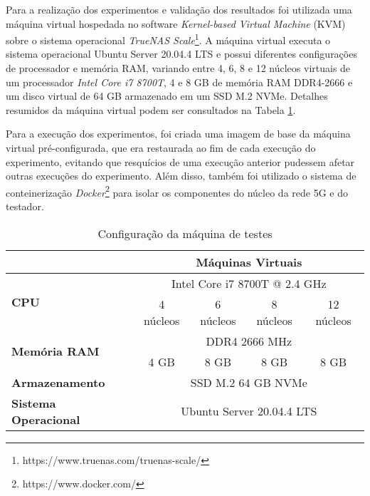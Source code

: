 
Para a realização dos experimentos e validação dos resultados foi utilizada uma máquina virtual hospedada no software \textit{Kernel-based Virtual Machine} (KVM) sobre o sistema operacional \textit{TrueNAS Scale}\footnote{https://www.truenas.com/truenas-scale/}.
A máquina virtual executa o sistema operacional Ubuntu Server 20.04.4 LTS e possui diferentes configurações de processador e memória RAM, variando entre 4, 6, 8 e 12 núcleos virtuais de um processador \textit{Intel Core i7 8700T}, 4 e 8 GB de memória RAM DDR4-2666 e um disco virtual de 64 GB armazenado em um SSD M.2 NVMe.
Detalhes resumidos da máquina virtual podem ser consultados na Tabela \ref{tab:vm-config}.

Para a execução dos experimentos, foi criada uma imagem de base da máquina virtual pré-configurada, que era restaurada ao fim de cada execução do experimento, evitando que resquícios de uma execução anterior pudessem afetar outras execuções do experimento.
Além disso, também foi utilizado o sistema de conteinerização \textit{Docker}\footnote{https://www.docker.com/} para isolar os componentes do núcleo da rede 5G e do testador.

\begin{table}[!ht]
\centering
\caption{Configuração da máquina de testes}
\label{tab:vm-config}
\begin{tabular}{|l|cccc|}
\hline
                                      & \multicolumn{4}{c|}{\textbf{Máquinas Virtuais}}    \\ \hline
\multirow{2}{*}{\textbf{CPU}}         & \multicolumn{4}{c|}{Intel Core i7 8700T @ 2.4 GHz} \\ \cline{2-5} 
 & \multicolumn{1}{c|}{4 núcleos} & \multicolumn{1}{c|}{6 núcleos} & \multicolumn{1}{c|}{8 núcleos} & 12 núcleos \\ \hline
\multirow{2}{*}{\textbf{Memória RAM}} & \multicolumn{4}{c|}{DDR4 2666 MHz}                 \\ \cline{2-5} 
 & \multicolumn{1}{c|}{4 GB}      & \multicolumn{1}{c|}{8 GB}      & \multicolumn{1}{c|}{8 GB}      & 8 GB       \\ \hline
\textbf{Armazenamento}                & \multicolumn{4}{c|}{SSD M.2 64 GB NVMe}            \\ \hline
\textbf{Sistema Operacional}          & \multicolumn{4}{c|}{Ubuntu Server 20.04.4 LTS}     \\ \hline
\end{tabular}
\end{table}

